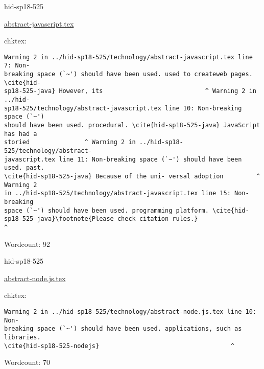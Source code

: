 \begin{IU}

hid-sp18-525

\href{https://github.com/cloudmesh-community/hid-sp18-525/blob/master//technology/abstract-javascript.tex}{abstract-javascript.tex}

 
chktex:
\begin{tiny}
\begin{verbatim}
Warning 2 in ../hid-sp18-525/technology/abstract-javascript.tex line 7: Non-
breaking space (`~') should have been used. used to createweb pages. \cite{hid-
sp18-525-java} However, its                            ^ Warning 2 in ../hid-
sp18-525/technology/abstract-javascript.tex line 10: Non-breaking space (`~')
should have been used. procedural. \cite{hid-sp18-525-java} JavaScript has had a
storied               ^ Warning 2 in ../hid-sp18-525/technology/abstract-
javascript.tex line 11: Non-breaking space (`~') should have been used. past.
\cite{hid-sp18-525-java} Because of the uni- versal adoption         ^ Warning 2
in ../hid-sp18-525/technology/abstract-javascript.tex line 15: Non-breaking
space (`~') should have been used. programming platform. \cite{hid-
sp18-525-java}\footnote{Please check citation rules.}                        ^
\end{verbatim}
\end{tiny}

Wordcount: 92

\end{IU}



\begin{IU}

hid-sp18-525

\href{https://github.com/cloudmesh-community/hid-sp18-525/blob/master//technology/abstract-node.js.tex}{abstract-node.js.tex}

 
chktex:
\begin{tiny}
\begin{verbatim}
Warning 2 in ../hid-sp18-525/technology/abstract-node.js.tex line 10: Non-
breaking space (`~') should have been used. applications, such as libraries.
\cite{hid-sp18-525-nodejs}                                    ^
\end{verbatim}
\end{tiny}

Wordcount: 70

\end{IU}

